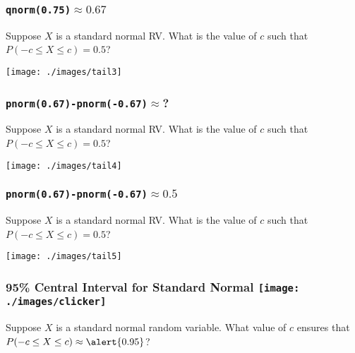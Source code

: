 \begin{frame}
\frametitle{\texttt{qnorm(0.75)}$\approx 0.67$}
Suppose $X$ is a standard normal RV. What is the value of $c$ such that $P(-c \leq X\leq c ) = 0.5$?
\begin{center}
\texttt{[image: ./images/tail3]}
\end{center}
\end{frame}


\begin{frame}
\frametitle{\texttt{pnorm(0.67)-pnorm(-0.67)}$\approx$?}
Suppose $X$ is a standard normal RV. What is the value of $c$ such that $P(-c \leq X\leq c ) = 0.5$?
\begin{center}
\texttt{[image: ./images/tail4]}
\end{center}
\end{frame}



\begin{frame}
\frametitle{\texttt{pnorm(0.67)-pnorm(-0.67)}$\approx 0.5$}
Suppose $X$ is a standard normal RV. What is the value of $c$ such that $P(-c \leq X\leq c ) = 0.5$?
\begin{center}
\texttt{[image: ./images/tail5]}
\end{center}
\end{frame}
\begin{frame}
\frametitle{95\% Central Interval for Standard Normal \hfill \texttt{[image: ./images/clicker]}}

Suppose $X$ is a standard normal random variable. What value of $c$ ensures that $P(-c \leq X \leq c) \approx \alert{0.95}$?

\end{frame}



